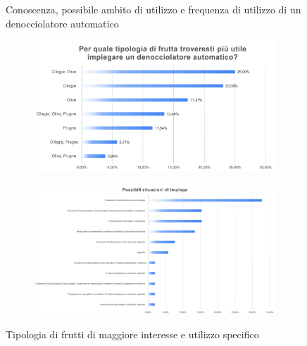 \documentclass[12pt,a4paper,twoside]{report}  %
\begin{document}
\begin{figure}[htbp]
\begin{subfigure}[b]{0.45\textwidth}
    \caption{}
    \label{fig:frequenza_utilizzo}
  \end{subfigure}
  \caption{Conoscenza, possibile ambito di utilizzo e frequenza di utilizzo di un denocciolatore automatico}
  \label{fig:utilizzo_denocciolatore}
\end{figure}

\begin{figure}[H]
  \centering
  \begin{subfigure}[b]{\textwidth}
    \centering
    \includegraphics[width=\textwidth]{tipologiaFrutta.png}
    \caption{}
    \label{fig:tipologia_frutta}
  \end{subfigure}
  \vspace{0.5cm}

  \begin{subfigure}[b]{\textwidth}
    \centering
    \includegraphics[width=\textwidth]{situazioniImpiego.png}
    \caption{}
    \label{fig:situazioni_impiego}
  \end{subfigure}

  \caption{Tipologia di frutti di maggiore interesse e utilizzo specifico}
  \label{fig:frutti_e_utilizzo}
\end{figure}
\end{document}
